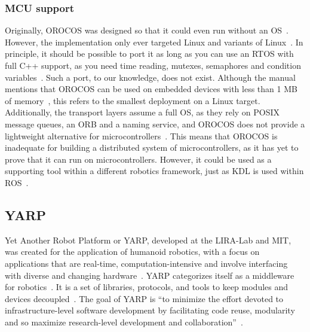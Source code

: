 \documentclass[a4paper]{book}
\begin{document}
\subsubsection{MCU support}
Originally, OROCOS was designed so that it could even run without an
OS~\cite{bruyninckx2003realtime}. However, the implementation only ever targeted
Linux and variants of Linux~\cite{bruyninckx2003realtime, orocos_rtt_manual}. In
principle, it should be possible to port it as long as you can use an RTOS with
full C++ support, as you need time reading, mutexes, semaphores and condition
variables~\cite{orocos_rtt_manual}. Such a port, to our knowledge, does not
exist. Although the manual mentions that OROCOS can be used on embedded devices
with less than 1 MB of memory~\cite{orocos_rtt_manual}, this refers to the
smallest deployment on a Linux target. Additionally, the transport layers assume
a full OS, as they rely on POSIX message queues, an ORB and a naming service,
and OROCOS does not provide a lightweight alternative for
microcontrollers~\cite{orocos_rtt_manual}. This means that OROCOS is inadequate
for building a distributed system of microcontrollers, as it has yet to prove
that it can run on microcontrollers. However, it could be used as a supporting
tool within a different robotics framework, just as KDL is used within
ROS~\cite{orocos_history}.
\subsection{YARP}
\label{sec:yarp}
Yet Another Robot Platform or YARP, developed at the LIRA-Lab and MIT, was
created for the application of humanoid robotics, with a focus on applications
that are real-time, computation-intensive and involve interfacing with diverse
and changing hardware~\cite{metta2006yarp}. YARP categorizes itself as a
middleware for robotics~\cite{fitzpatrick2014middle}. It is a set of libraries,
protocols, and tools to keep modules and devices
decoupled~\cite{yarp_docs_what}. The goal of YARP is \enquote{to minimize the
effort devoted to infrastructure-level software development by facilitating code
reuse, modularity and so maximize research-level development and
collaboration}~\cite{metta2006yarp}.
\end{document}
